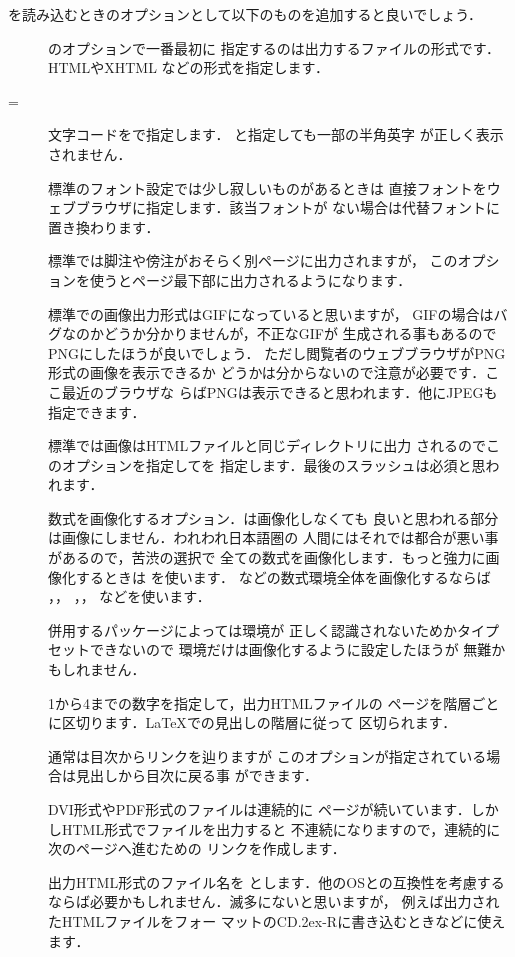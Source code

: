 を読み込むときのオプションとして以下のものを追加すると良いでしょう．
\begin{description}
 \item[]
  のオプションで一番最初に
 指定するのは出力するファイルの形式です．
HTMLやXHTML
などの形式を指定します．
 \item[=]
 文字コードをで指定します．
 と指定しても一部の半角英字%
 が正しく表示されません．
 \item[] 
 標準のフォント設定では少し寂しいものがあるときは
 直接フォントをウェブブラウザに指定します．該当フォントが
 ない場合は代替フォントに置き換わります．
 \item[] 
 標準では脚注や傍注がおそらく別ページに出力されますが，
 このオプションを使うとページ最下部に出力されるようになります．
 \item[] 
 標準での画像出力形式はGIFになっていると思いますが，
 GIFの場合はバグなのかどうか分かりませんが，不正なGIFが
 生成される事もあるのでPNGにしたほうが良いでしょう．
 ただし閲覧者のウェブブラウザがPNG形式の画像を表示できるか
 どうかは分からないので注意が必要です．ここ最近のブラウザな
 らばPNGは表示できると思われます．他にJPEGも
指定できます．
 \item[] 
 標準では画像はHTMLファイルと同じディレクトリに出力
 されるのでこのオプションを指定してを
 指定します．最後のスラッシュは必須と思われます．
 \item[]
 数式を画像化するオプション．は画像化しなくても
 良いと思われる部分は画像にしません．われわれ日本語圏の
 人間にはそれでは都合が悪い事があるので，苦渋の選択で
 全ての数式を画像化します．もっと強力に画像化するときは
 を使います．
 などの数式環境全体を画像化するならば
 ，，
 ，，
 などを使います．
 \item[]
 併用するパッケージによっては環境が
 正しく認識されないためかタイプセットできないので
 環境だけは画像化するように設定したほうが
 無難かもしれません．
 \item[] 1から4までの数字を指定して，出力HTMLファイルの
ページを階層ごとに区切ります．{\LaTeX}での見出しの階層に従って
区切られます．
 \item[] 通常は目次からリンクを辿りますが
このオプションが指定されている場合は見出しから目次に戻る事
ができます．
 \item[] DVI形式やPDF形式のファイルは連続的に
ページが続いています．しかしHTML形式でファイルを出力すると
不連続になりますので，連続的に次のページへ進むための
リンクを作成します．
 \item[] 出力HTML形式のファイル名を
とします．他のOSとの互換性を考慮する
ならば必要かもしれません．滅多にないと思いますが，
例えば出力されたHTMLファイルをフォー
マットのCD\raise.2ex\hbox{-}Rに書き込むときなどに使えます．

\end{description}

